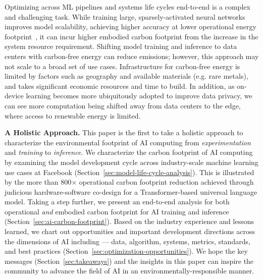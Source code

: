 Optimizing across ML pipelines and systems life cycles end-to-end is a complex and challenging task. 
While training large, sparsely-activated neural networks improves model scalability, achieving higher accuracy at lower operational energy footprint~\cite{Patterson:arxiv:2021},
it can incur higher embodied carbon footprint from the increase in the system resource requirement.
Shifting model training and inference to data centers with carbon-free energy can reduce emissions; however, this approach may not scale to a broad set of use cases.
Infrastructure for carbon-free energy is limited by factors such as geography and available materials (e.g. rare metals), and takes significant economic resources and time to build.
In addition, as on-device learning becomes more ubiquitously adopted to improve data privacy, we can see more computation being shifted away from data centers to the edge, where access to renewable energy is limited. 

\textbf{A Holistic Approach.} This paper is the first to take a holistic approach to characterize the environmental footprint of AI computing from \textit{experimentation} and \textit{training} to \textit{inference}. We characterize the carbon footprint of AI computing by examining the model development cycle across industry-scale machine learning use cases at Facebook (Section~\ref{sec:model-life-cycle-analysis}). This is illustrated by the more than 800$\times$ operational carbon footprint reduction achieved through judicious hardware-software co-design for a Transformer-based universal language model.
Taking a step further, we present an end-to-end analysis for both operational \textit{and} embodied carbon footprint for AI training and inference (Section~\ref{sec:ai-carbon-footprint}).
Based on the industry experience and lessons learned, we chart out opportunities and important development directions across the dimensions of AI including --- data, algorithm, systems, metrics, standards, and best practices (Section~\ref{sec:optimization-opportunities}). 
We hope the key messages (Section~\ref{sec:takeaways}) and the insights in this paper can inspire the community to advance the field of AI in an environmentally-responsible manner.


